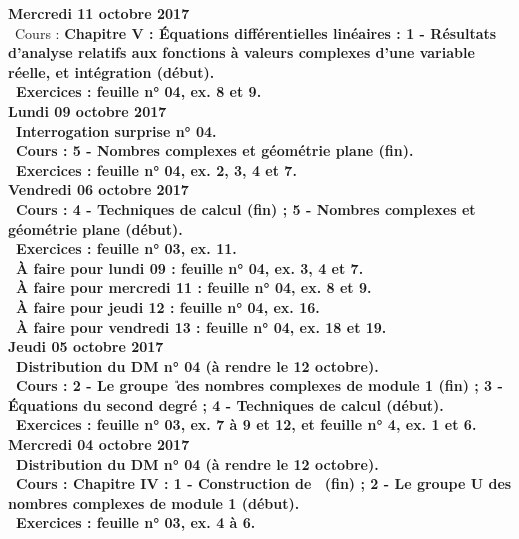 \documentclass[12pt,a4paper]{article}
\begin{document}
\noindent\textbf{\bf Mercredi 11 octobre 2017}\\
\bu\ Cours : \bf Chapitre V \rm : Équations différentielles linéaires : 1 - Résultats d'analyse relatifs aux 
fonctions à valeurs complexes d'une variable réelle, et intégration (début).\\
\bu\ Exercices : feuille n° 04, ex. 8 et 9.\vspace{.4cm}\\

\noindent\textbf{\bf Lundi 09 octobre 2017}\\
\bu\ Interrogation surprise n° 04.\\
\bu\ Cours : 5 - Nombres complexes et géométrie plane (fin).\\
\bu\ Exercices : feuille n° 04, ex. 2, 3, 4 et 7.\vspace{.4cm}\\

\noindent\textbf{Vendredi 06 octobre 2017}\\
\bu\ Cours : 4 - Techniques de calcul (fin) ; 5 - Nombres complexes et géométrie plane (début).\\
\bu\ Exercices : feuille n° 03, ex. 11.\\
\bu\ À faire pour lundi 09 : feuille n° 04, ex. 3, 4 et 7.\\
\bu\ À faire pour mercredi 11 : feuille n° 04, ex. 8 et 9.\\
\bu\ À faire pour jeudi 12 : feuille n° 04, ex. 16.\\
\bu\ À faire pour vendredi 13 : feuille n° 04, ex. 18 et 19.\vspace{.4cm}\\

\noindent\textbf{Jeudi 05 octobre 2017}\\
\bu\ Distribution du DM n° 04 (à rendre le 12 octobre).\\
\bu\ Cours : 2 - Le groupe \U\ des nombres complexes de module 1 (fin) ; 3 - Équations du second degré ; 4 - Techniques 
de calcul (début).\\
\bu\ Exercices : feuille n° 03, ex. 7 à 9 et 12, et feuille n° 4, ex. 1 et 6.\vspace{.4cm}\\

\noindent\textbf{\bf Mercredi 04 octobre 2017}\\
\bu\ Distribution du DM n° 04 (à rendre le 12 octobre).\\
\bu\ Cours : \bf Chapitre IV \rm : 1 - Construction de \C\ (fin) ; 2 - Le groupe \textbf{U} des nombres 
complexes de module 1 (début).\\
\bu\ Exercices : feuille n° 03, ex. 4 à 6.\vspace{.4cm}\\
\end{document}
